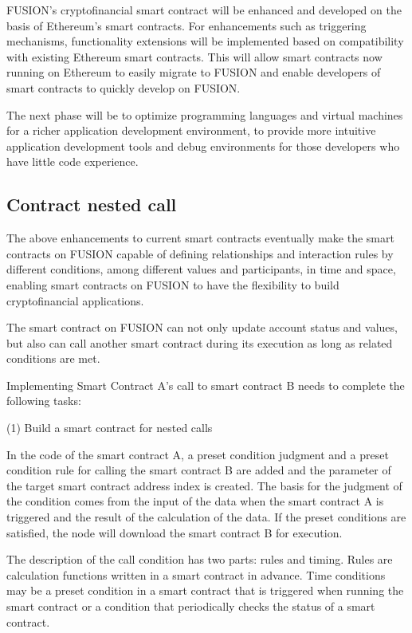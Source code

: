 \documentclass[a4paper,12pt]{article}
\begin{document}
FUSION's cryptofinancial smart contract will be enhanced and developed on the basis of Ethereum's smart contracts. For enhancements such as triggering mechanisms, functionality extensions will be implemented based on compatibility with existing Ethereum smart contracts. This will allow smart contracts now running on Ethereum to easily migrate to FUSION and enable developers of smart contracts to quickly develop on FUSION.

The next phase will be to optimize programming languages and virtual machines for a richer application development environment, to provide more intuitive application development tools and debug environments for those developers who have little code experience.

\subsection{Contract nested call}

The above enhancements to current smart contracts eventually make the smart contracts on FUSION capable of defining relationships and interaction rules by different conditions, among different values and participants, in time and space, enabling smart contracts on FUSION to have the flexibility to build cryptofinancial applications.

The smart contract on FUSION can not only update account status and values, but also can call another smart contract during its execution as long as related conditions are met.

Implementing Smart Contract A's call to smart contract B needs to complete the following tasks:

(1) Build a smart contract for nested calls

In the code of the smart contract A, a preset condition judgment and a preset condition rule for calling the smart contract B are added and the parameter of the target smart contract address index is created. The basis for the judgment of the condition comes from the input of the data when the smart contract A is triggered and the result of the calculation of the data. If the preset conditions are satisfied, the node will download the smart contract B for execution.

The description of the call condition has two parts: rules and timing. Rules are calculation functions written in a smart contract in advance. Time conditions may be a preset condition in a smart contract that is triggered when running the smart contract or a condition that periodically checks the status of a smart contract.
\end{document}
